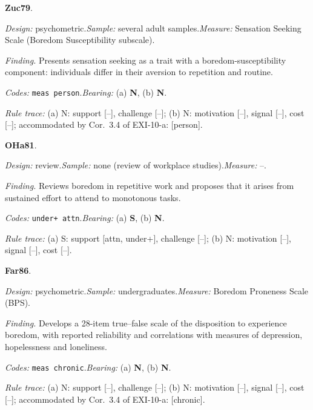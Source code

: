 \medskip
{}
\noindent\textbf{Zuc79}\enspace \citet{Zuckerman1979}.\par
{\small\noindent\textit{Design:} psychometric.\quad \textit{Sample:} several adult samples.\quad \textit{Measure:} Sensation Seeking Scale (Boredom Susceptibility subscale).\par
\noindent\textit{Finding.} Presents sensation seeking as a trait with a boredom-susceptibility component: individuals differ in their aversion to repetition and routine.\par
\noindent\textit{Codes:} \texttt{meas person}.\quad \textit{Bearing:} (a) \textbf{N}, (b) \textbf{N}.\par
\noindent\textit{Rule trace:} (a) N: support {[}--{]}, challenge {[}--{]}; (b) N: motivation {[}--{]}, signal {[}--{]}, cost {[}--{]}; accommodated by Cor.~3.4 of EXI-10-a: {[}person{]}.\par}
\medskip
{}
\noindent\textbf{OHa81}\enspace \citet{OHanlon1981}.\par
{\small\noindent\textit{Design:} review.\quad \textit{Sample:} none (review of workplace studies).\quad \textit{Measure:} --.\par
\noindent\textit{Finding.} Reviews boredom in repetitive work and proposes that it arises from sustained effort to attend to monotonous tasks.\par
\noindent\textit{Codes:} \texttt{under+ attn}.\quad \textit{Bearing:} (a) \textbf{S}, (b) \textbf{N}.\par
\noindent\textit{Rule trace:} (a) S: support {[}attn, under+{]}, challenge {[}--{]}; (b) N: motivation {[}--{]}, signal {[}--{]}, cost {[}--{]}.\par}
\medskip
{}
\noindent\textbf{Far86}\enspace \citet{FarmerSundberg1986}.\par
{\small\noindent\textit{Design:} psychometric.\quad \textit{Sample:} undergraduates.\quad \textit{Measure:} Boredom Proneness Scale (BPS).\par
\noindent\textit{Finding.} Develops a 28-item true--false scale of the disposition to experience boredom, with reported reliability and correlations with measures of depression, hopelessness and loneliness.\par
\noindent\textit{Codes:} \texttt{meas chronic}.\quad \textit{Bearing:} (a) \textbf{N}, (b) \textbf{N}.\par
\noindent\textit{Rule trace:} (a) N: support {[}--{]}, challenge {[}--{]}; (b) N: motivation {[}--{]}, signal {[}--{]}, cost {[}--{]}; accommodated by Cor.~3.4 of EXI-10-a: {[}chronic{]}.\par}
